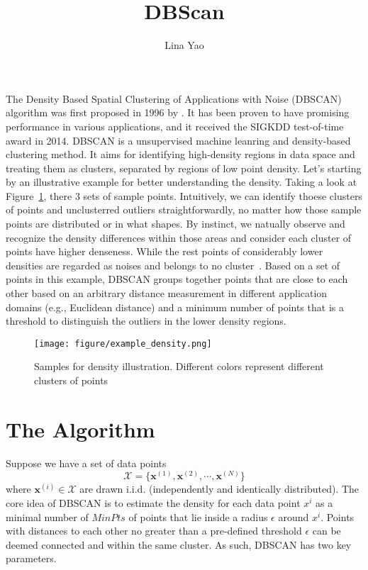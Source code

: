 \title{DBScan}
\label{chp:dbscan}
\author{Lina Yao}
\maketitle


The Density Based Spatial Clustering of Applications with Noise (DBSCAN) 
algorithm was first proposed in 1996 by \cite{ester1996density}. It has been 
proven to have promising performance in various applications, and it received 
the SIGKDD test-of-time award in 2014.  DBSCAN is a unsupervised machine leanring and density-based clustering method. 
It aims for identifying high-density regions in data space and treating them as 
clusters, separated by regions of low point density. Let's starting by an 
illustrative example for better understanding the density. Taking a look at Figure~\ref{fig:example}, there 3 sets of sample points. Intuitively, we can identify thoese clusters of points and unclusterred outliers straightforwardly, no matter how those sample points are distributed or in what shapes. By instinct, we natually observe and recognize the density differences within those areas and consider each cluster of points have higher denseness. While the rest points of considerably lower densities are regarded as noises and belongs to no cluster~\cite{ester1996density}. Based on a set of points in this 
example, DBSCAN groups together points that are close to each other based on an 
arbitrary distance measurement in different application domains 
(e.g., Euclidean distance) and a minimum number of points that is a threshold to 
distinguish the outliers in the lower density regions. 


\begin{figure}[tbp]
	\centering
	\label{fig:example}
	\texttt{[image: figure/example\_density.png]}
	\caption{Samples for density illustration. Different colors represent different clusters of points}
\end{figure}


\section{The Algorithm}

Suppose we have a set of data points \[\mathcal{X} = 
\{\mathbf{x}^{(1)},\mathbf{x}^{(2)},\cdots,\mathbf{x}^{(N)}\}\]
\noindent where $\mathbf{x}^{(i)} \in \mathcal{X}$ are drawn i.i.d. 
(independently and identically distributed).  The core idea of DBSCAN is to 
estimate the density for each data point $x^{i}$ as a minimal number of 
$MinPts$ of points that lie inside a radius $\epsilon$ around $x^{i}$. 
Points with distances to each other no greater than a pre-defined threshold $\epsilon$ can be deemed connected and within the same cluster.
As such, DBSCAN has two key parameters. 

